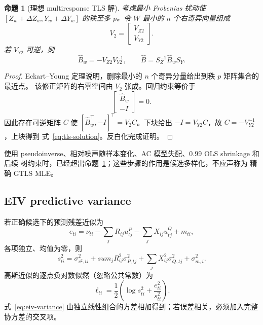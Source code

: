 \documentclass[UTF8,11pt]{ctexart}
\newtheorem{proposition}[definition]{命题}
\begin{document}
\begin{proposition}[理想 multiresponse TLS 解]
\label{prop:tls-svd}
考虑最小 Frobenius 扰动使 $[Z_w+\Delta Z_w,Y_w+\Delta Y_w]$ 的秩至多
$p$。令 $W$ 最小的 $n$ 个右奇异向量组成
\begin{equation*}
 V_2=\begin{bmatrix}V_{Z2}\\V_{Y2}\end{bmatrix}.
\end{equation*}
若 $V_{Y2}$ 可逆，则
\begin{equation}
 \widehat B_w=-V_{Z2}V_{Y2}^{-1},
 \qquad
 \widehat B=S_Z^{-1}\widehat B_wS_Y.
 \label{eq:tls-solution}
\end{equation}
\end{proposition}

\begin{proof}
Eckart--Young 定理说明，删除最小的 $n$ 个奇异分量给出到秩 $p$ 矩阵集合的最近点。
该修正矩阵的右零空间由 $V_2$ 张成。回归约束等价于
\begin{equation*}
 [Z_w+\Delta Z_w,Y_w+\Delta Y_w]
 \begin{bmatrix}\widehat B_w\\-I\end{bmatrix}=0.
\end{equation*}
因此存在可逆矩阵 $C$ 使
$[\widehat B_w^\top,-I]^\top=V_2C$。下块给出
$-I=V_{Y2}C$，故 $C=-V_{Y2}^{-1}$，上块得到
式~\eqref{eq:tls-solution}。反白化完成证明。
\end{proof}

使用 pseudoinverse、相对噪声随样本变化、AC 模型失配、$0.99$ OLS shrinkage 和后续
树约束时，已经超出命题~\ref{prop:tls-svd}；这些步骤的作用是候选多样化，不应声称为
精确 GTLS MLE。

\subsection{EIV predictive variance}

若正确候选下的预测残差近似为
\begin{equation*}
 e_{ti}=\nu_{ti}-\sum_jR_{ij}u^P_{tj}-\sum_jX_{ij}u^Q_{tj}+m_{ti},
\end{equation*}
各项独立、均值为零，则
\begin{equation}
 s_{ti}^2=\sigma_{v^2,ti}^2+sum_jR_{ij}^2\sigma_{P,tj}^2
 +\sum_jX_{ij}^2\sigma_{Q,tj}^2+\sigma_{m,i}^2.
 \label{eq:eiv-variance}
\end{equation}
高斯近似的逐点负对数似然（忽略公共常数）为
\begin{equation}
 \ell_{ti}=\frac12\left(\log s_{ti}^2+\frac{e_{ti}^2}{s_{ti}^2}\right).
 \label{eq:gaussian-nll}
\end{equation}
式~\eqref{eq:eiv-variance} 由独立线性组合的方差相加得到；若误差相关，必须加入完整
协方差的交叉项。
\end{document}
